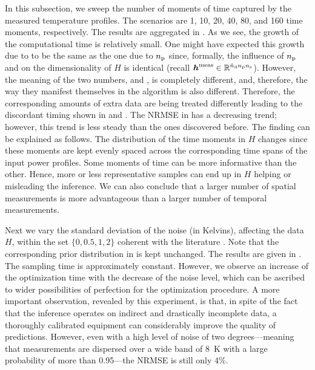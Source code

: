 
In this subsection, we sweep the number of moments of time \ns captured by the
measured temperature profiles. The scenarios are 1, 10, 20, 40, 80, and 160 time
moments, respectively. The results are aggregated in
. As we see, the growth of the computational time is
relatively small. One might have expected this growth due to \ns to be the same
as the one due to ${n_\mathrm{p}}$ since, formally, the influence of ${n_\mathrm{p}}$ and \ns on the
dimensionality of $H$ is identical (recall $\boldsymbol{h}^{\mathrm{meas}} \in \mathbb{R}^{{\hat{n}_\mathrm{d}} {n_\mathrm{p}}
{n_\mathrm{s}}}$). However, the meaning of the two numbers, \np and \ns, is completely
different, and, therefore, the way they manifest themselves in the algorithm is
also different. Therefore, the corresponding amounts of extra data are being
treated differently leading to the discordant timing shown in
 and . The NRMSE in
 has a decreasing trend; however, this trend is less
steady than the ones discovered before. The finding can be explained as follows.
The distribution of the time moments in $H$ changes since these moments are kept
evenly spaced across the corresponding time spans of the input power profiles.
Some moments of time can be more informative than the other. Hence, more or less
representative samples can end up in $H$ helping or misleading the inference. We
can also conclude that a larger number of spatial measurements is more
advantageous than a larger number of temporal measurements.


Next we vary the standard deviation of the noise (in Kelvins), affecting the
data $H$, within the set $\{ 0, 0.5, 1, 2 \}$ coherent with the literature
\cite{mesa-martinez2007}. Note that the corresponding prior distribution in
 is kept unchanged. The results are given in
. The sampling time is approximately constant. However, we
observe an increase of the optimization time with the decrease of the noise
level, which can be ascribed to wider possibilities of perfection for the
optimization procedure. A more important observation, revealed by this
experiment, is that, in spite of the fact that the inference operates on
indirect and drastically incomplete data, a thoroughly calibrated equipment can
considerably improve the quality of predictions. However, even with a high level
of noise of two degrees---meaning that measurements are dispersed over a wide
band of 8~K with a large probability of more than 0.95---the NRMSE is still only
4\%.

